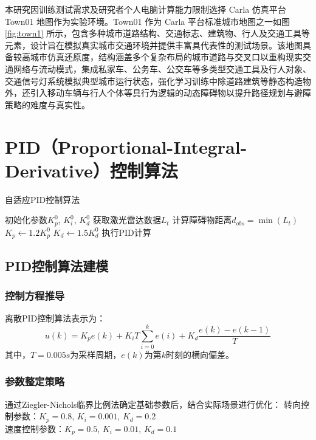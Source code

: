 本研究因训练测试需求及研究者个人电脑计算能力限制选择 Carla 仿真平台 Town01 地图作为实验环境。Town01 作为 Carla 平台标准城市地图之一如图 \ref {fig:town1} 所示，包含多种城市道路结构、交通标志、建筑物、行人及交通工具等元素，设计旨在模拟真实城市交通环境并提供丰富具代表性的测试场景。该地图具备较高城市仿真还原度，结构涵盖多个复杂布局的城市道路与交叉口以重构现实交通网络与流动模式，集成私家车、公务车、公交车等多类型交通工具及行人对象、交通信号灯系统模拟典型城市运行状态，强化学习训练中除道路建筑等静态构造物外，还引入移动车辆与行人个体等具行为逻辑的动态障碍物以提升路径规划与避障策略的难度与真实性。

\section{PID（Proportional-Integral-Derivative）控制算法}

\begin{algorithm}[H]
	\caption{自适应PID控制算法}
	\begin{algorithmic}[1]
	\STATE 初始化参数$K_p^0$, $K_i^0$, $K_d^0$  %
 	\STATE 获取激光雷达数据$L_t$
  	\STATE 计算障碍物距离$d_{obs} = \min(L_t)$
    	\STATE $K_p \gets 1.2K_p^0$
    	\STATE $K_d \gets 1.5K_d^0$
  	\ENDIF
  	\STATE 执行PID计算
	\ENDWHILE
	\end{algorithmic}
\end{algorithm}

\subsection{PID控制算法建模}

\subsubsection{控制方程推导}
离散PID控制算法表示为：
\begin{equation}
	u(k) = K_p e(k) + K_i T \sum_{i=0}^k e(i) + K_d \frac{e(k)-e(k-1)}{T}
\end{equation}
其中，$T=0.005s$为采样周期，$e(k)$为第$k$时刻的横向偏差。

\subsubsection{参数整定策略}
通过Ziegler-Nichols临界比例法确定基础参数后，结合实际场景进行优化：
转向控制参数：$K_p=0.8$, $K_i=0.001$, $K_d=0.2$\\
速度控制参数：$K_p=0.5$, $K_i=0.01$, $K_d=0.1$

